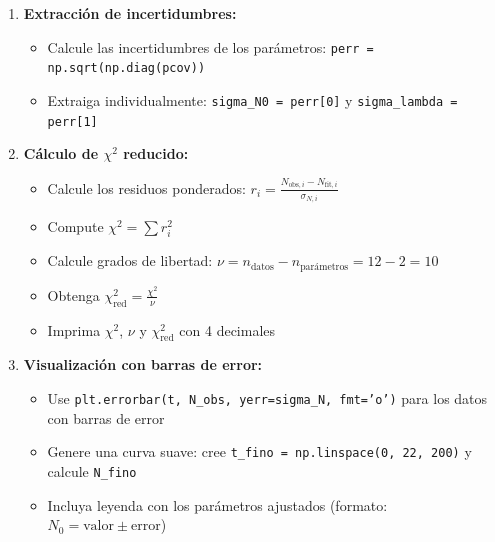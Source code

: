 \documentclass[10pt]{article}
\begin{document}
\begin{tcolorbox}[title={Pregunta 2 – Decaimiento Radiactivo (scipy.optimize.curve\_fit)}]
\begin{enumerate}
  \item \textbf{Extracción de incertidumbres:}
  \begin{itemize}
    \item Calcule las incertidumbres de los parámetros: \texttt{perr = np.sqrt(np.diag(pcov))}
    \item Extraiga individualmente: \texttt{sigma\_N0 = perr[0]} y \texttt{sigma\_lambda = perr[1]}
  \end{itemize}
  
  \item \textbf{Cálculo de $\chi^2$ reducido:}
  \begin{itemize}
    \item Calcule los residuos ponderados: $r_i = \frac{N_{\text{obs},i} - N_{\text{fit},i}}{\sigma_{N,i}}$
    \item Compute $\chi^2 = \sum r_i^2$
    \item Calcule grados de libertad: $\nu = n_{\text{datos}} - n_{\text{parámetros}} = 12 - 2 = 10$
    \item Obtenga $\chi^2_{\text{red}} = \frac{\chi^2}{\nu}$
    \item Imprima $\chi^2$, $\nu$ y $\chi^2_{\text{red}}$ con 4 decimales
  \end{itemize}
  
  \item \textbf{Visualización con barras de error:}
  \begin{itemize}
    \item Use \texttt{plt.errorbar(t, N\_obs, yerr=sigma\_N, fmt='o')} para los datos con barras de error
    \item Genere una curva suave: cree \texttt{t\_fino = np.linspace(0, 22, 200)} y calcule \texttt{N\_fino}
    \item Incluya leyenda con los parámetros ajustados (formato: $N_0 = \text{valor} \pm \text{error}$)
  \end{itemize}
  
\end{enumerate}


\end{tcolorbox}


\end{document}
